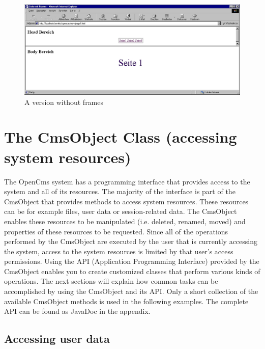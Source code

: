 \begin{figure}[hbt]
\begin{center}
\includegraphics[width=\sgw]
                   {pics/templateMech/frames_2}
\caption[A version without frames]
           {A version without frames}
\label{noFrames}
\end{center}
\end{figure}

\section{The CmsObject Class (accessing system resources)}

The OpenCms system has a programming interface that provides access to the
system and all of its resources. The majority of the interface is part
of the {\name CmsObject} that provides methods to access system resources.
These resources can be for example files, user data or session-related
data. The {\name CmsObject} enables these resources to be manipulated (i.e.
deleted, renamed, moved) and properties of these resources to be
requested. Since all of the operations performed by the {\name CmsObject} are
executed by the user that is currently accessing the system, access to
the system resources is limited by that user's access permissions.
Using the API (Application Programming Interface) provided by the
{\name CmsObject} enables you to create customized classes that perform various
kinds of operations.
The next sections will explain how common tasks can be accomplished by
using the {\name CmsObject} and its API. Only a short collection of the
available {\name CmsObject} methods is used in the following examples. The
complete API can be found as JavaDoc in the appendix.

\subsection{Accessing user data}

